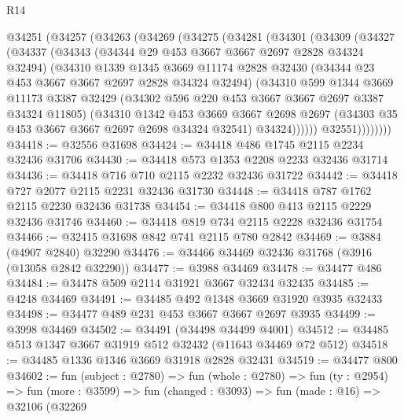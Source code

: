 \begin{lexlean}{R14}
\begin{coremodule}
    @34251
      (@34257
        (@34263
          (@34269
            (@34275
              (@34281
                (@34301
                  (@34309
                    (@34327
                      (@34337
                        (@34343
                          (@34344 @29 @453 @3667 @3667 @2697 @2828 @34324 @32494)
                          (@34310
                            @1339
                            @1345
                            @3669
                            @11174
                            @2828
                            @32430
                            (@34344 @23 @453 @3667 @3667 @2697 @2828 @34324 @32494)
                            (@34310
                              @599
                              @1344
                              @3669
                              @11173
                              @3387
                              @32429
                              (@34302 @596 @220 @453 @3667 @3667 @2697 @3387 @34324 @11805)
                              (@34310
                                @1342
                                @453
                                @3669
                                @3667
                                @2698
                                @2697
                                (@34303 @35 @453 @3667 @3667 @2697 @2698 @34324 @32541)
                                @34324))))))
                    @32551))))))))
@34418 := @32556 @31698
@34424 := @34418 @486 @1745 @2115 @2234 @32436 @31706
@34430 := @34418 @573 @1353 @2208 @2233 @32436 @31714
@34436 := @34418 @716 @710 @2115 @2232 @32436 @31722
@34442 := @34418 @727 @2077 @2115 @2231 @32436 @31730
@34448 := @34418 @787 @1762 @2115 @2230 @32436 @31738
@34454 := @34418 @800 @413 @2115 @2229 @32436 @31746
@34460 := @34418 @819 @734 @2115 @2228 @32436 @31754
@34466 := @32415 @31698 @842 @741 @2115 @780 @2842
@34469 := @3884 (@4907 @2840) @32290
@34476 := @34466 @34469 @32436 @31768 (@3916 (@13058 @2842 @32290))
@34477 := @3988 @34469
@34478 := @34477 @486
@34484 := @34478 @509 @2114 @31921 @3667 @32434 @32435
@34485 := @4248 @34469
@34491 := @34485 @492 @1348 @3669 @31920 @3935 @32433
@34498 := @34477 @489 @231 @453 @3667 @3667 @2697 @3935
@34499 := @3998 @34469
@34502 := @34491 (@34498 @34499 @4001)
@34512 := @34485 @513 @1347 @3667 @31919 @512 @32432 (@11643 @34469 @72 @512)
@34518 := @34485 @1336 @1346 @3669 @31918 @2828 @32431
@34519 := @34477 @800
@34602 := fun (subject : @2780) =>
  fun (whole : @2780) =>
  fun (ty : @2954) =>
  fun (more : @3599) =>
  fun (changed : @3093) =>
  fun (made : @16) =>
  @32106
    (@32269

\end{coremodule}
\end{lexlean}
